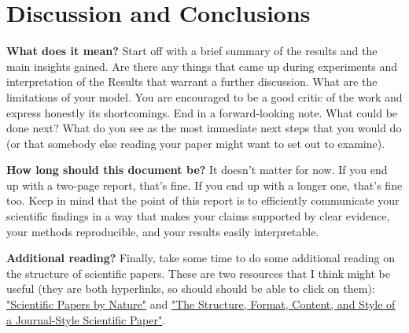 \documentclass[letterpaper]{article}
\begin{document}
\section{Discussion and Conclusions}
{\bf  What does it mean?} Start off with a brief summary of the results and the main insights gained. Are there any things that came up during experiments and interpretation of the Results that warrant a further discussion. What are the limitations of your model. You are encouraged to be a good critic of the work and express honestly its shortcomings. End in a forward-looking note. What could be done next? What do you see as the most immediate next steps that you would do (or that somebody else reading your paper might want to set out to examine). 

{\bf How long should this document be?} It doesn't matter for now. If you end up with a two-page report, that's fine. If you end up with a longer one, that's fine too. Keep in mind that the point of this report is to efficiently communicate your scientific findings in a way that makes your claims supported by clear evidence, your methods reproducible, and your results easily interpretable. 

{\bf Additional reading?} Finally, take some time to do some additional reading on the structure of scientific papers. These are two resources that I think might be useful (they are both hyperlinks, so should should be able to click on them): 
\href{https://www.nature.com/scitable/topicpage/scientific-papers-13815490/}{"Scientific Papers by Nature"} and
\href{https://abacus.bates.edu/~ganderso/biology/resources/writing/HTWsections.html}{"The Structure, Format, Content, and Style of a  Journal-Style Scientific Paper"}. 

\footnotesize


\end{document}
